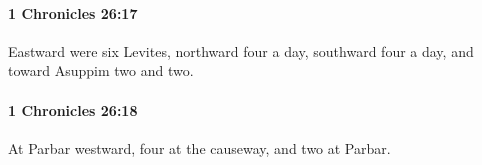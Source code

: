 		\paragraph{1 Chronicles 26:17} %
			\label{1CHRONICLES-26-17}

			Eastward were six Levites, northward four a day, southward four a day, and toward Asuppim two and two.


		\paragraph{1 Chronicles 26:18} %
			\label{1CHRONICLES-26-18}

			At Parbar westward, four at the causeway, and two at Parbar.


